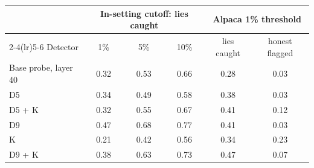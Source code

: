 \begin{tabular}{@{}l ccc cc@{}}
\toprule
 & \multicolumn{3}{c}{In-setting cutoff: lies caught} & \multicolumn{2}{c}{Alpaca 1\% threshold} \\
\cmidrule(lr){2-4}\cmidrule(lr){5-6}
Detector & 1\% & 5\% & 10\% & lies caught & honest flagged \\
\midrule
Base probe, layer 40 & 0.32 & 0.53 & 0.66 & 0.28 & 0.03 \\
D5 & 0.34 & 0.49 & 0.58 & 0.38 & 0.03 \\
D5 + K & 0.32 & 0.55 & 0.67 & 0.41 & 0.12 \\
D9 & 0.47 & 0.68 & 0.77 & 0.41 & 0.03 \\
K & 0.21 & 0.42 & 0.56 & 0.34 & 0.23 \\
D9 + K & 0.38 & 0.63 & 0.73 & 0.47 & 0.07 \\
\bottomrule
\end{tabular}
